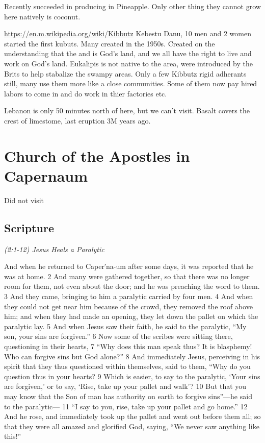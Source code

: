 \documentclass[letterpaper]{report}
\begin{document}
Recently succeeded in producing in Pineapple. Only other thing they cannot grow here natively is coconut.

\url{https://en.m.wikipedia.org/wiki/Kibbutz}
Kebestu Danu, 10 men and 2 women started the first kubuts. Many created in the 1950s.
Created on the understanding that the and is God's land, and we all have the right to live and work on God's land.
Eukalipis is not native to the area, were introduced by the Brits to help stabalize the swampy areas.
Only a few Kibbutz rigid adherants still, many use them more like a close communities.  Some of them now pay hired labors to come in and do work in thier factories etc.

Lebanon is only 50 minutes north of here,  but we can't visit.
Basalt covers the crest of limestome, last eruption 3M years ago.

\clearpage
\section{Church of the Apostles in Capernaum}
\begin{multicols}{2}
	Did not visit
\end{multicols}
\subsection{Scripture}

{\centering
	\emph{(2:1-12) Jesus Heals a Paralytic}\\
}
\begin{multicols}{2}
And when he returned to Caper′na-um after some days, it was reported that he was at home. 2 And many were gathered together, so that there was no longer room for them, not even about the door; and he was preaching the word to them. 3 And they came, bringing to him a paralytic carried by four men. 4 And when they could not get near him because of the crowd, they removed the roof above him; and when they had made an opening, they let down the pallet on which the paralytic lay. 5 And when Jesus saw their faith, he said to the paralytic, “My son, your sins are forgiven.” 6 Now some of the scribes were sitting there, questioning in their hearts, 7 “Why does this man speak thus? It is blasphemy! Who can forgive sins but God alone?” 8 And immediately Jesus, perceiving in his spirit that they thus questioned within themselves, said to them, “Why do you question thus in your hearts? 9 Which is easier, to say to the paralytic, ‘Your sins are forgiven,’ or to say, ‘Rise, take up your pallet and walk’? 10 But that you may know that the Son of man has authority on earth to forgive sins”—he said to the paralytic— 11 “I say to you, rise, take up your pallet and go home.” 12 And he rose, and immediately took up the pallet and went out before them all; so that they were all amazed and glorified God, saying, “We never saw anything like this!”
\end{multicols}
\end{document}
